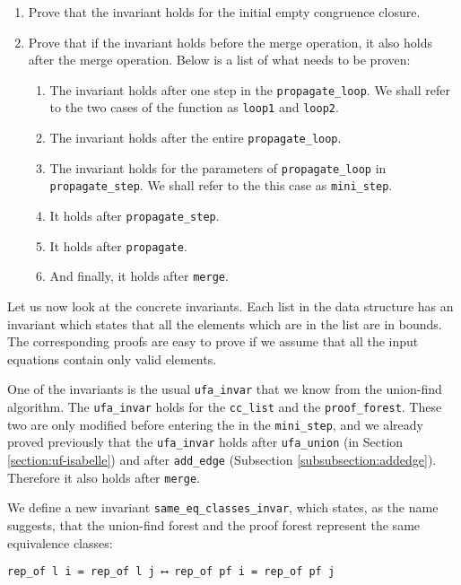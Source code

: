 \begin{enumerate}
	\item Prove that the invariant holds for the initial empty congruence closure.

	\item Prove that if the invariant holds before the merge operation, it also holds after the merge operation. Below is a list of what needs to be proven:
    \begin{enumerate}
        \item The invariant holds after one step in the \lstinline{propagate_loop}. We shall refer to the two cases of the function as \lstinline{loop1} and \lstinline{loop2}.
    	\item The invariant holds after the entire \lstinline{propagate_loop}.
    	\item The invariant holds for the parameters of \lstinline{propagate_loop} in \lstinline{propagate_step}. We shall refer to the this case as \lstinline{mini_step}.
    	\item It holds after \lstinline{propagate_step}.
    	\item It holds after \lstinline{propagate}.
    	\item And finally, it holds after \lstinline{merge}.
    \end{enumerate}
\end{enumerate}

Let us now look at the concrete invariants. Each list in the data structure has an invariant which states that all the elements which are in the list are in bounds. The corresponding proofs are easy to prove if we assume that all the input equations contain only valid elements.

One of the invariants is the usual \lstinline{ufa_invar} that we know from the union-find algorithm. The \lstinline{ufa_invar} holds for the \lstinline{cc_list} and the \lstinline{proof_forest}. These two are only modified before entering the in the \lstinline{mini_step}, and we already proved previously that the \lstinline{ufa_invar} holds after \lstinline{ufa_union} (in Section \ref{section:uf-isabelle}) and after \lstinline{add_edge} (Subsection \ref{subsubsection:addedge}). Therefore it also holds after \lstinline{merge}.

We define a new invariant \lstinline{same_eq_classes_invar}, which states, as the name suggests, that the union-find forest and the proof forest represent the same equivalence classes:

\begin{lstlisting}
rep_of l i = rep_of l j ⟷ rep_of pf i = rep_of pf j
\end{lstlisting}

